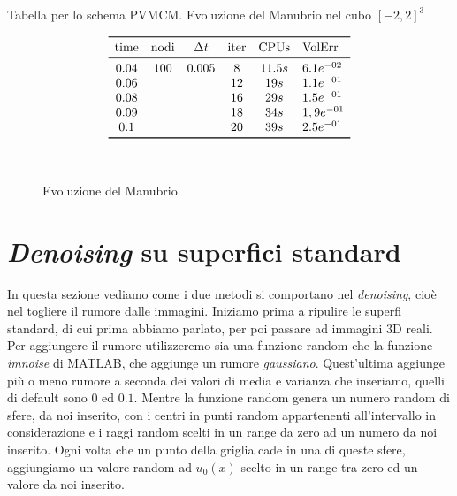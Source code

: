 \begin{table}[htb!]
\caption{Tabella per lo schema PVMCM. Evoluzione del Manubrio nel cubo $[-2,2]^3$}
\label{tab:cp4-sc1-03}
\[
\begin{array}{*{5}{c}l}
    \toprule
    \text{time} &\text{nodi} &\Delta t &\text{iter} &\text{CPUs}&\text{VolErr} \\
    \midrule
     0.04       & 100        & 0.005   & 8          & 11.5s    &6.1e^{-02}\\
     0.06       &            &         & 12         & 19s      &1.1e^{-01}\\ 
     0.08       &            &         & 16         & 29s      &1.5e^{-01}\\ 
     0.09       &            &         & 18         & 34s      &1,9e^{-01}\\
     0.1        &            &         & 20         & 39s      &2.5e^{-01}\\     
     \bottomrule
\end{array}
\]
\end{table}

\begin{figure}[htb!]
  \centering
  \quad
  \\
  \quad
  \quad
  \caption{Evoluzione del Manubrio}
  \label{fig:cp4-sc1-03}
\end{figure}

%
\section{\emph{Denoising} su superfici standard}

In questa sezione vediamo come i due metodi si comportano nel
\emph{denoising}, cioè nel togliere il rumore dalle immagini. Iniziamo
prima a ripulire le superfi standard, di cui prima abbiamo parlato,
per poi passare ad immagini 3D reali. Per aggiungere il rumore
utilizzeremo sia una funzione random che la funzione \emph{imnoise} di
MATLAB, che aggiunge un rumore \emph{gaussiano}. Quest'ultima aggiunge
più o meno rumore a seconda dei valori di media e varianza che
inseriamo, quelli di default sono $0$ ed $0.1$. Mentre la funzione
random genera un numero random di sfere, da noi inserito, con i centri
in punti random appartenenti all'intervallo in considerazione e i
raggi random scelti in un range da zero ad un numero da noi
inserito. Ogni volta che un punto della griglia cade in una di queste
sfere, aggiungiamo un valore random ad $u_0(x)$ scelto in un range tra
zero ed un valore da noi inserito.

